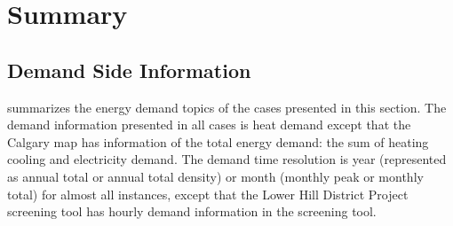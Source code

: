 \section{Summary}\label{summaryMap}
\subsection{Demand Side Information}\label{sec:demandInfo}
 summarizes the energy demand topics of the cases
presented in this section. The demand information presented in all
cases is heat demand except that the Calgary map has information of
the total energy demand: the sum of heating cooling and electricity
demand. The demand time resolution is year (represented as annual
total or annual total density) or month (monthly peak or monthly
total) for almost all instances, except that the Lower Hill District
Project screening tool has hourly demand information in the screening
tool.

